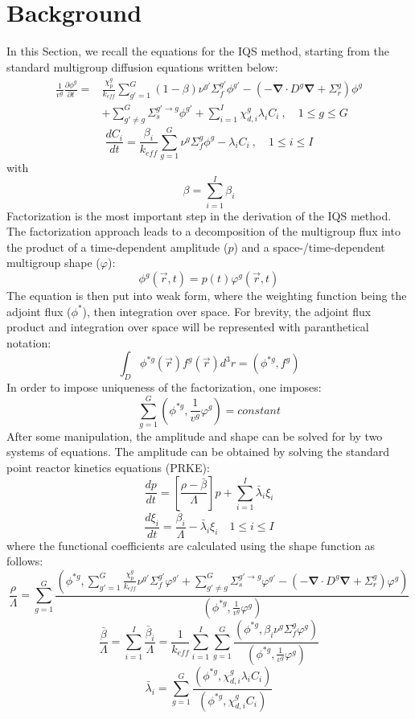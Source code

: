 \documentclass[11pt]{scrartcl}
\renewcommand{\div}{\bs{\nabla}\! \cdot \!}
\newcommand{\grad}{\bs{\nabla}}
\newcommand{\bs}[1]{\mathbf{#1}}
\newcommand{\keff}{k_\textit{eff}}
\newcommand{\be}{\begin{equation}}
\newcommand{\ee}{\end{equation}}
\begin{document}
\section{Background}

In this Section, we recall the equations for the IQS method, starting from the standard multigroup diffusion equations written below:
\begin{align}
\frac{1}{v^g} \frac{\partial \phi^g }{\partial t} =& \frac{\chi_p^g}{\keff} \sum_{g'=1}^G (1-\beta) \nu^{g'} \Sigma_f^{g'} \phi^{g'} -  \left( -\div D^g \grad  + \Sigma_r^g \right) \phi^g  \nonumber \\
&  + \sum_{g'\neq g}^G\Sigma_s^{g'\to g} \phi^{g'}  + \sum_{i=1}^I\chi_{d,i}^g\lambda_i C_i \ , \quad 1 \le g \le G 
\end{align}
\be
\frac{dC_i}{dt} = \frac{\beta_i}{k_{eff}}\sum_{g=1}^G\nu^{g} \Sigma_f^g \phi^{g} - \lambda_i C_i \ , \quad 1 \le i \le I 
\ee
with
\be
\beta = \sum_{i=1}^I \beta_{i} 
\ee
Factorization is the most important step in the derivation of the IQS method. The factorization approach leads to a decomposition of the multigroup flux into the product of a time-dependent amplitude ($p$) and a space-/time-dependent multigroup shape ($\varphi$):
\be
\phi^g(\vec{r},t)=p(t)\varphi^g(\vec{r},t)
\ee
The equation is then put into weak form, where the weighting function being the adjoint flux ($\phi^*$), then integration over space.  For brevity, the adjoint flux product and integration over space will be represented with paranthetical notation:
\be
\int_D\phi^{*g}(\vec{r})f^g(\vec{r})d^3r=\left(\phi^{*g},f^g\right)
\ee
In order to impose uniqueness of the factorization, one imposes:
\be
\sum_{g=1}^G\left(\phi^{*g},\frac{1}{v^g}\varphi^g\right)=constant
\ee
After some manipulation, the amplitude and shape can be solved for by two systems of equations.  The amplitude can be obtained by solving the standard point reactor kinetics equations (PRKE):
\be
\frac{dp}{dt}=\left[\frac{\rho-\bar{\beta}}{\Lambda}\right]p+\sum_{i=1}^I\bar{\lambda}_i\xi_i
\ee
\be
\frac{d\xi_i}{dt}=\frac{\bar{\beta}_i}{\Lambda}-\bar{\lambda}_i\xi_i \quad 1 \le i \le I 
\ee
where the functional coefficients are calculated using the shape function as follows:
\be
\frac{\rho}{\Lambda}=\sum_{g=1}^G\frac{ \left(\phi^{*g},\sum_{g'=1}^G\frac{\chi_p^g}{k_{eff}} \nu^{g'} \Sigma_f^{g'}\varphi^{g'} + \sum_{g'\neq g}^G\Sigma_s^{g'\to g} \varphi^{g'} -\left( -\div D^g \grad  + \Sigma_r^g \right)\varphi^g\right)}{\left(\phi^{*g},\frac{1}{v^g}\varphi^g\right)}
\ee
\be
\frac{\bar{\beta}}{\Lambda}=\sum_{i=1}^I\frac{\bar{\beta}_i}{\Lambda}=\frac{1}{k_{eff}}\sum_{i=1}^I\sum_{g=1}^G\frac{(\phi^{*g}, \beta_i\nu^{g} \Sigma_f^g \varphi^{g})}{\left(\phi^{*g},\frac{1}{v^g}\varphi^g\right)}
\ee
\be
\bar{\lambda}_i=\sum_{g=1}^G\frac{(\phi^{*g},\chi_{d,i}^g\lambda_i C_i)}{(\phi^{*g},\chi_{d,i}^gC_i)}
\ee
\end{document}
